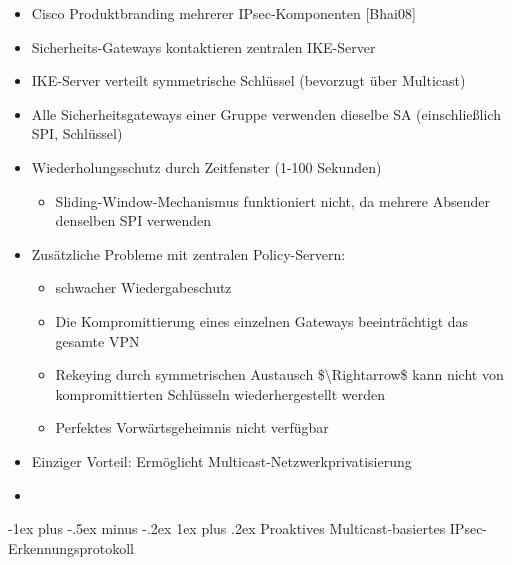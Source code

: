 \documentclass[a4paper]{article}
\makeatletter
\renewcommand{\subsubsection}{\@startsection{subsubsection}{3}{0mm}%
 {-1ex plus -.5ex minus -.2ex}%
 {1ex plus .2ex}%
 {\normalfont\small\bfseries}}
\makeatother
\begin{document}
\begin{multicols}{3}
    \begin{itemize}
        \item
              Cisco Produktbranding mehrerer IPsec-Komponenten {[}Bhai08{]}
        \item
              Sicherheits-Gateways kontaktieren zentralen IKE-Server
        \item
              IKE-Server verteilt symmetrische Schlüssel (bevorzugt über Multicast)
        \item
              Alle Sicherheitsgateways einer Gruppe verwenden dieselbe SA
              (einschließlich SPI, Schlüssel)
        \item
              Wiederholungsschutz durch Zeitfenster (1-100 Sekunden)

              \begin{itemize}
                  \item
                        Sliding-Window-Mechanismus funktioniert nicht, da mehrere Absender
                        denselben SPI verwenden
              \end{itemize}
        \item
              Zusätzliche Probleme mit zentralen Policy-Servern:

              \begin{itemize}
                  \item
                        schwacher Wiedergabeschutz
                  \item
                        Die Kompromittierung eines einzelnen Gateways beeinträchtigt das
                        gesamte VPN
                  \item
                        Rekeying durch symmetrischen Austausch \$\textbackslash Rightarrow\$
                        kann nicht von kompromittierten Schlüsseln wiederhergestellt werden
                  \item
                        Perfektes Vorwärtsgeheimnis nicht verfügbar
              \end{itemize}
        \item
              Einziger Vorteil: Ermöglicht Multicast-Netzwerkprivatisierung
        \item
    \end{itemize}


    \subsubsection{Proaktives Multicast-basiertes
        IPsec-Erkennungsprotokoll}


\end{multicols}
\end{document}
